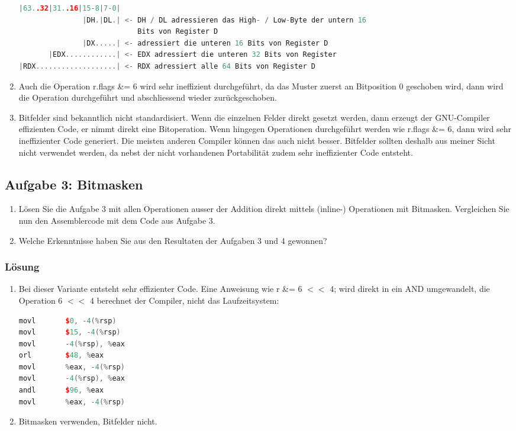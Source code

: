\begin{enumerate}
\begin{lstlisting}[language=C++, style=C++]
|63..32|31..16|15-8|7-0|
               |DH.|DL.| <- DH / DL adressieren das High- / Low-Byte der untern 16
                            Bits von Register D
               |DX.....| <- adressiert die unteren 16 Bits von Register D
       |EDX............| <- EDX adressiert die unteren 32 Bits von Register
|RDX...................| <- RDX adressiert alle 64 Bits von Register D
\end{lstlisting}
  \item Auch die Operation r.flags \&= 6 wird sehr ineffizient durchgeführt, da das Muster zuerst an Bitposition 0 geschoben wird, dann wird die Operation durchgeführt und abschliessend wieder zurückgeschoben.
  \item Bitfelder sind bekanntlich nicht standardisiert. Wenn die einzelnen Felder direkt gesetzt werden, dann erzeugt der GNU-Compiler effizienten Code, er nimmt direkt eine Bitoperation. Wenn hingegen Operationen durchgeführt werden wie r.flags \&= 6, dann wird sehr ineffizienter Code generiert. Die meisten anderen Compiler können das auch nicht besser. Bitfelder sollten deshalb aus meiner Sicht nicht verwendet werden, da nebst der nicht vorhandenen Portabilität zudem sehr ineffizienter Code entsteht.

\end{enumerate}

\subsection{Aufgabe 3: Bitmasken}
\begin{enumerate}
  \item Lösen Sie die Aufgabe 3 mit allen Operationen ausser der Addition direkt mittels (inline-) Operationen mit Bitmasken. Vergleichen Sie nun den Assemblercode mit dem Code aus Aufgabe 3.
  \item  Welche Erkenntnisse haben Sie aus den Resultaten der Aufgaben 3 und 4 gewonnen?
\end{enumerate}

\subsubsection{Lösung}

\begin{enumerate}
  \item Bei dieser Variante entsteht sehr effizienter Code. Eine Anweisung wie r \&= 6 $<<$ 4; wird direkt in ein AND umgewandelt, die Operation 6 $<<$ 4 berechnet der Compiler, nicht das Laufzeitsystem:
\begin{lstlisting}[language=C++, style=C++]
movl       $0, -4(%rsp)
movl       $15, -4(%rsp)
movl       -4(%rsp), %eax
orl        $48, %eax
movl       %eax, -4(%rsp)
movl       -4(%rsp), %eax
andl       $96, %eax
movl       %eax, -4(%rsp)
\end{lstlisting}
  \item  Bitmasken verwenden, Bitfelder nicht.


\end{enumerate}
